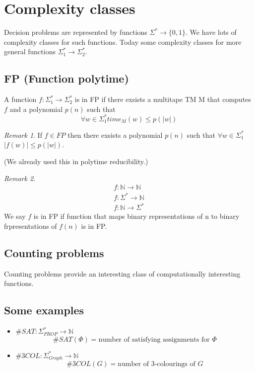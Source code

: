 \documentclass[a4paper,12pt]{article}
\theoremstyle{definition}
\theoremstyle{remark}
\newtheorem*{remark}{Remark}
\newcommand{\N}{\mathbb{N}}
\begin{document}
\newpage
\section{Complexity classes}
Decision problems are represented by functions $\Sigma^* \to \{0, 1\}$. We have lots of complexity classes for such functions.
Today some complexity classes for more general functions $\Sigma_1^* \to \Sigma_2^*$.

\subsection{FP (Function polytime)}
A function $f: \Sigma_1^* \to \Sigma_2^*$ is in FP if there exsists a multitape TM M that 
computes $f$ and a polynomial $p(n)$ such that
\begin{equation*}
    \forall w \in \Sigma_1^* time_M(w) \leq p(|w|)
\end{equation*}

\begin{remark}
    If $f \in FP$ then there exsists a polynomial $p(n)$ such that $\forall w \in \Sigma_1^*$ $|f(w)| \leq p(|w|)$.
\end{remark}

(We already used this in polytime reducibility.)

\begin{remark}
    \begin{gather*}
        f: \N \to \N \\
        f: \Sigma^* \to \N \\
        f: \N \to \Sigma^*
    \end{gather*}
    We say $f$ is in FP if function that maps binary representations of n to binary frpresentations of $f(n)$ is in FP.%
\end{remark}

\subsection{Counting problems}
Counting problems provide an interesting class of computationally interesting functions.

\subsection{Some examples}

\begin{itemize}
    \item $\#SAT: \Sigma_{PROP}^* \to \N$
    \begin{equation*}
        \#SAT(\Phi) = \text{number of satisfying assignments for } \Phi
    \end{equation*}
    \item $\#3COL: \Sigma_{Graph}^* \to \N$
    \begin{equation*}
        \#3COL(G) = \text{number of 3-colourings of } G
    \end{equation*}
\end{itemize}
\end{document}
